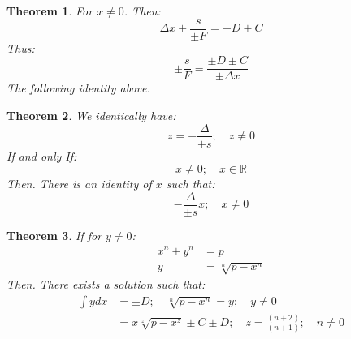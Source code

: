 \documentclass[10pt, twocolumn]{article}
\theoremstyle{plain}
\newtheorem{theorem}{Theorem}[section]
\theoremstyle{definition}
\theoremstyle{remark}
\begin{document}
\begin{theorem}
For $x\neq 0$. Then:
\begin{equation}
  \Delta x \pm \frac{s}{\pm F} = \pm D \pm C 
\end{equation}
Thus:
\begin{equation}
  \pm \frac{s}{F} = \frac{\pm D \pm C}{\pm \Delta x }
\end{equation}
The following identity above.
\end{theorem}

\begin{theorem}
We identically have:
\begin{equation}
  z = -\frac{\Delta}{\pm s}; \quad z \neq 0
\end{equation}
If and only If:
\begin{equation}
  x \neq 0; \quad x \in \mathbb{R}
\end{equation}
Then. There is an identity of $x$ such that:
\begin{equation}
  -\frac{\Delta}{\pm s}x; \quad x \neq 0
\end{equation}
\end{theorem}

\begin{theorem}
If for $y \neq 0$:
\begin{align*}
x^n + y^n &= p \\
y &= \sqrt[n]{p - x^n}
\end{align*}
Then. There exists a solution such that:
\begin{align*}
  \int y dx &= \pm D; \quad \sqrt[n]{p - x^n} = y; \quad y \neq 0 \\
  &= x\sqrt[z]{p - x^{z}} \pm C \pm D; \quad z = \frac{(n+2)}{(n+1)}; \quad n \neq 0
\end{align*}
\end{theorem}

\nocite{*}



\end{document}
